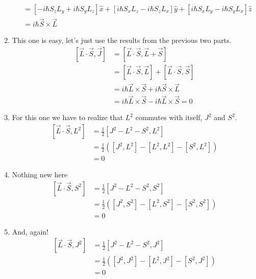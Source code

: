 \documentclass[11pt]{article}
\begin{document}
\begin{enumerate}[label=\alph*)]
\begin{align*}
&= \left[-i\hbar S_zL_y + i\hbar S_yL_z\right]\hat{x} + \left[i\hbar S_xL_z - i\hbar S_zL_x\right]\hat{y} + \left[i\hbar S_xL_y - i\hbar S_y L_x\right]\hat{z}\\
&= i\hbar \vec{S}\times \vec{L}
\end{align*}
\item  This one is easy, let's just use the results from the previous two parts.
\begin{align*}
\left[\vec{L}\cdot \vec{S}, \vec{J}\right] & = \left[\vec{L}\cdot \vec{S}, \vec{L}+\vec{S}\right]\\
& = \left[\vec{L}\cdot \vec{S}, \vec{L}\right] + \left[\vec{L}\cdot \vec{S}, \vec{S}\right]\\
&= i\hbar \vec{L} \times \vec{S} + i\hbar \vec{S} \times \vec{L}\\
&= i\hbar \vec{L} \times \vec{S} - i\hbar \vec{L} \times \vec{S} = 0
\end{align*}
\item For this one we have to realize that $L^2$ commutes with itself, $J^2$ and $S^2$.
\begin{align*}
\left[\vec{L}\cdot \vec{S}, L^2\right] & = \frac{1}{2}\left[J^2 - L^2 - S^2, L^2\right]\\
& = \frac{1}{2}\left(\left[J^2, L^2\right] - \left[L^2, L^2\right] - \left[S^2, L^2\right]\right)\\
& = 0
\end{align*}
\item Nothing new here
\begin{align*}
\left[\vec{L}\cdot\vec{S}, S^2\right] & = \frac{1}{2}\left[J^2 - L^2 - S^2, S^2\right]\\
& = \frac{1}{2}\left(\left[J^2, S^2\right] - \left[L^2, S^2\right] - \left[S^2, S^2\right]\right)\\
&=0
\end{align*}
\item And, again!
\begin{align*}
\left[\vec{L}\cdot\vec{S}, J^2\right] & = \frac{1}{2}\left[J^2 - L^2 - S^2, J^2\right]\\
& = \frac{1}{2}\left(\left[J^2, J^2\right] - \left[L^2, J^2\right] - \left[S^2, J^2\right]\right)\\
&=0
\end{align*}

\end{enumerate}

\newpage
\end{document}
